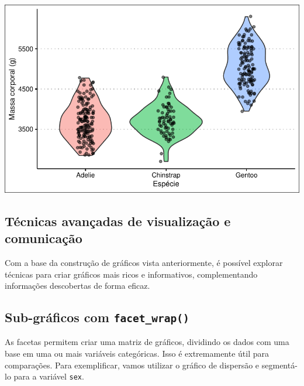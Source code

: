 \documentclass[
  12pt,
  letterpaper,
  DIV=11,
  numbers=noendperiod]{scrreprt}
\theoremstyle{definition}
\theoremstyle{exemplo}
\begin{document}
\includegraphics{03-tidyverse_files/figure-pdf/unnamed-chunk-29-1.pdf}

\subsection{Técnicas avançadas de visualização e
comunicação}\label{tuxe9cnicas-avanuxe7adas-de-visualizauxe7uxe3o-e-comunicauxe7uxe3o}

Com a base da construção de gráficos vista anteriormente, é possível
explorar técnicas para criar gráficos mais ricos e informativos,
complementando informações descobertas de forma eficaz.

\subsection{\texorpdfstring{Sub-gráficos com
\texttt{facet\_wrap()}}{Sub-gráficos com facet\_wrap()}}\label{sub-gruxe1ficos-com-facet_wrap}

As facetas permitem criar uma matriz de gráficos, dividindo os dados com
uma base em uma ou mais variáveis categóricas. Isso é extremamente útil
para comparações. Para exemplificar, vamos utilizar o gráfico de
dispersão e segmentá-lo para a variável \texttt{sex}.
\end{document}
